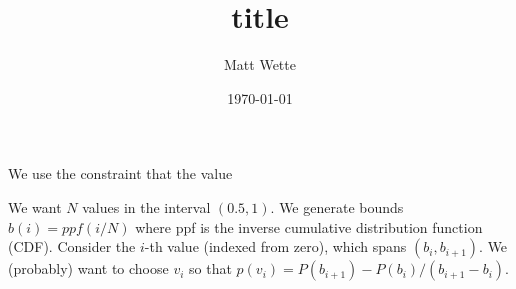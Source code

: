 \documentclass{article}
\title{%
title
}
\author{Matt Wette }
\date{\today}
\begin{document}
We use the constraint that the value

We want $N$ values in the interval $(0.5,1)$.
We generate bounds $b(i) = ppf(i/N)$ where ppf is the inverse
cumulative distribution function (CDF).
Consider the $i$-th value (indexed from zero),
which spans $(b_i,b_{i+1})$.  We (probably) want to choose $v_i$ so
that $p(v_i) = P(b_{i+1})-P(b_i)/(b_{i+1}-b_i)$.


\end{document}
